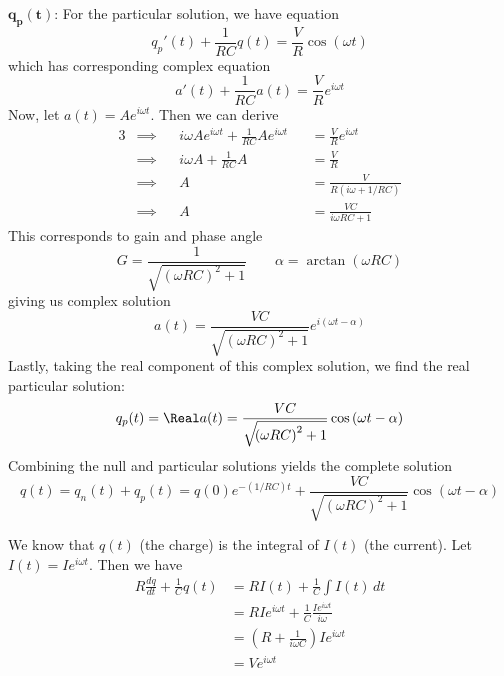 \documentclass[a4paper]{article}
\begin{document}
\(\bm{q_{p} \!\left( t \right) }\): For the particular solution, we have equation
\[
	q_{p}' \!\left( t \right) + \frac{1}{RC} q \!\left( t \right) = \frac{V}{R} \cos\left( \omega t \right)
\]
which has corresponding complex equation
\[
	a'\!\left( t \right) + \frac{1}{RC} a \!\left( t \right) = \frac{V}{R} e^{i \omega t}
\]
Now, let \(a \!\left( t \right) = Ae^{i \omega t}\). Then we can derive
\begin{alignat*}{3}
	&\implies && i \omega A e^{i \omega t} + \frac{1}{RC} Ae^{i \omega t} && = \frac{V}{R} e^{i \omega t} \\
	&\implies && i \omega A + \frac{1}{RC} A && = \frac{V}{R} \\ 
	&\implies && A && = \frac{V}{R \!\left( i \omega + 1/RC \right) } \\
	&\implies && A && = \frac{VC}{i \omega RC + 1}
\end{alignat*}
This corresponds to gain and phase angle
\[
	G = \frac{1}{\sqrt{\!\left( \omega RC \right)^{2} + 1}} \qquad \alpha = \arctan \!\left( \omega RC \right) 
\]
giving us complex solution
\[
	a \!\left( t \right) = \frac{VC}{\sqrt{\!\left( \omega RC \right)^{2} + 1}} e^{i \!\left( \omega t - \alpha  \right) }
\]
Lastly, taking the real component of this complex solution, we find the real particular solution:
\[
	q_{p} \!\left( t \right) = \Real a \!\left( t \right) = \frac{VC}{\sqrt{\!\left( \omega RC \right)^{2} + 1}} \cos\left( \omega t - \alpha  \right)
\]
Combining the null and particular solutions yields the complete solution
\[
	q \!\left( t \right) = q_{n} \!\left( t \right) + q_{p} \!\left( t \right) = q \!\left( 0 \right) e^{-\!\left( 1/RC \right) t} + \frac{VC}{\sqrt{\!\left( \omega RC \right)^{2} + 1}} \cos\left( \omega t - \alpha  \right)
\]


We know that \(q \!\left( t \right) \) (the charge) is the integral of \(I \!\left( t \right) \) (the current). Let \(I \!\left( t \right) = I e^{i \omega t}\). Then we have
\begin{align*}
	R \frac{d q }{d t} + \frac{1}{C} q \!\left( t \right) & = R I \!\left( t \right) + \frac{1}{C} \int I \!\left( t \right) \, dt \\
					& = RIe^{i \omega t} + \frac{1}{C}\frac{Ie^{i \omega t}}{i \omega } \\
					& = \!\left( R + \frac{1}{i \omega C} \right) I e^{i \omega t} \\
					& = V e^{i \omega t}
\end{align*}
\end{document}
